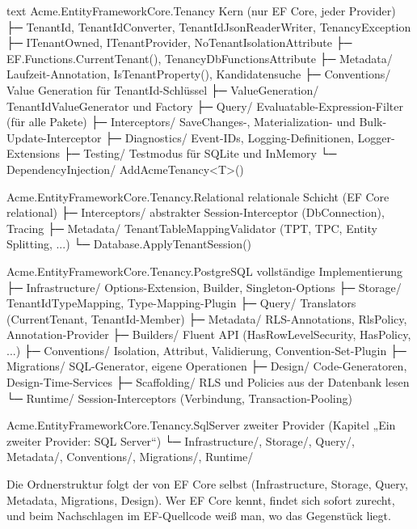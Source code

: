 \begin{sourcecode}{text}
Acme.EntityFrameworkCore.Tenancy               Kern (nur EF Core, jeder Provider)
├─ TenantId, TenantIdConverter, TenantIdJsonReaderWriter, TenancyException
├─ ITenantOwned, ITenantProvider, NoTenantIsolationAttribute
├─ EF.Functions.CurrentTenant(), TenancyDbFunctionsAttribute
├─ Metadata/         Laufzeit-Annotation, IsTenantProperty(), Kandidatensuche
├─ Conventions/      Value Generation für TenantId-Schlüssel
├─ ValueGeneration/  TenantIdValueGenerator und Factory
├─ Query/            Evaluatable-Expression-Filter (für alle Pakete)
├─ Interceptors/     SaveChanges-, Materialization- und Bulk-Update-Interceptor
├─ Diagnostics/      Event-IDs, Logging-Definitionen, Logger-Extensions
├─ Testing/          Testmodus für SQLite und InMemory
└─ DependencyInjection/  AddAcmeTenancy<T>()

Acme.EntityFrameworkCore.Tenancy.Relational    relationale Schicht (EF Core relational)
├─ Interceptors/     abstrakter Session-Interceptor (DbConnection), Tracing
├─ Metadata/         TenantTableMappingValidator (TPT, TPC, Entity Splitting, ...)
└─ Database.ApplyTenantSession()

Acme.EntityFrameworkCore.Tenancy.PostgreSQL    vollständige Implementierung
├─ Infrastructure/   Options-Extension, Builder, Singleton-Options
├─ Storage/          TenantIdTypeMapping, Type-Mapping-Plugin
├─ Query/            Translators (CurrentTenant, TenantId-Member)
├─ Metadata/         RLS-Annotations, RlsPolicy, Annotation-Provider
├─ Builders/         Fluent API (HasRowLevelSecurity, HasPolicy, ...)
├─ Conventions/      Isolation, Attribut, Validierung, Convention-Set-Plugin
├─ Migrations/       SQL-Generator, eigene Operationen
├─ Design/           Code-Generatoren, Design-Time-Services
├─ Scaffolding/      RLS und Policies aus der Datenbank lesen
└─ Runtime/          Session-Interceptors (Verbindung, Transaction-Pooling)

Acme.EntityFrameworkCore.Tenancy.SqlServer     zweiter Provider
                                               (Kapitel „Ein zweiter Provider: SQL Server“)
└─ Infrastructure/, Storage/, Query/, Metadata/, Conventions/, Migrations/, Runtime/
\end{sourcecode}

\begin{tip}
  Die Ordnerstruktur folgt der von EF Core selbst (Infrastructure, Storage, Query, Metadata,
  Migrations, Design). Wer EF Core kennt, findet sich sofort zurecht, und beim Nachschlagen
  im EF-Quellcode weiß man, wo das Gegenstück liegt.
\end{tip}


